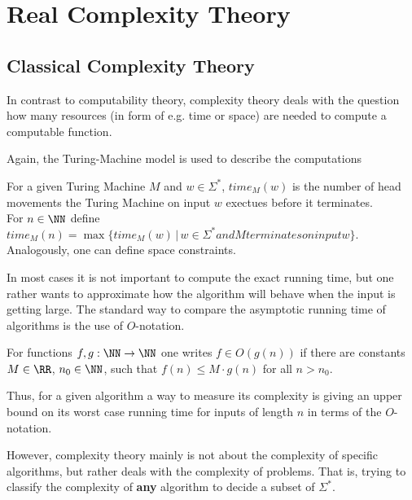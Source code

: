 \section{Real Complexity Theory}\label{section:real_complexity}
	\subsection{Classical Complexity Theory}
    In contrast to computability theory, complexity theory deals with the
    question how many resources (in form of e.g. time or space) are needed to
    compute a computable function.

    Again, the Turing-Machine model is used to describe the computations
		\begin{definition}
			For a given Turing Machine $M$ and $w \in \Sigma^*$, $time_M(w)$ is the number of head movements 
			the Turing Machine on input $w$ exectues before it terminates. \\
			For $n \in \NN$ define $time_M(n) = \max \{ time_M(w) \,|\, w \in \Sigma^* and M terminates on input w \}$.\\
			Analogously, one can define space constraints.
		\end{definition}
    In most cases it is not important to compute the exact running time, but
    one rather wants to approximate how the algorithm will behave when the
    input is getting large.
    The standard way to compare the asymptotic running time of algorithms is
    the use of $O$-notation.
		\begin{definition}
			For functions $f, g: \NN \to \NN$ one writes $f \in O(g(n))$ if there are constants $M \in \RR$, $n_0 \in \NN$, such that
			$ f(n) \leq M \cdot g(n)$ for all $n > n_0$. 
		\end{definition}
			Thus, for a given algorithm a way to measure its complexity is giving an
      upper bound on its worst case running time for inputs of length $n$ in
      terms of the $O$-notation. 

			However, complexity theory mainly is not about the complexity of specific
      algorithms, but rather deals with the complexity of problems. 
      That is, trying to classify the complexity of \textbf{any} algorithm to
      decide a subset of $\Sigma^*$.
      
